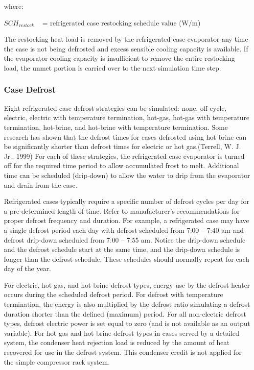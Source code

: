where:

\(SC{H_{restock}}\) ~ = refrigerated case restocking schedule value (W/m)

The restocking heat load is removed by the refrigerated case evaporator any time the case is not being defrosted and excess sensible cooling capacity is available. If the evaporator cooling capacity is insufficient to remove the entire restocking load, the unmet portion is carried over to the next simulation time step.

\subsubsection{Case Defrost}\label{case-defrost}

Eight refrigerated case defrost strategies can be simulated: none, off-cycle, electric, electric with temperature termination, hot-gas, hot-gas with temperature termination, hot-brine, and hot-brine with temperature termination. Some research has shown that the defrost times for cases defrosted using hot brine can be significantly shorter than defrost times for electric or hot gas.(Terrell, W. J. Jr., 1999) For each of these strategies, the refrigerated case evaporator is turned off for the required time period to allow accumulated frost to melt. Additional time can be scheduled (drip-down) to allow the water to drip from the evaporator and drain from the case.

Refrigerated cases typically require a specific number of defrost cycles per day for a pre-determined length of time. Refer to manufacturer's recommendations for proper defrost frequency and duration. For example, a refrigerated case may have a single defrost period each day with defrost scheduled from 7:00 -- 7:40 am and defrost drip-down scheduled from 7:00 -- 7:55 am. Notice the drip-down schedule and the defrost schedule start at the same time, and the drip-down schedule is longer than the defrost schedule. These schedules should normally repeat for each day of the year.

For electric, hot gas, and hot brine defrost types, energy use by the defrost heater occurs during the scheduled defrost period. For defrost with temperature termination, the energy is also multiplied by the defrost ratio simulating a defrost duration shorter than the defined (maximum) period. For all non-electric defrost types, defrost electric power is set equal to zero (and is not available as an output variable). For hot gas and hot brine defrost types in cases served by a detailed system, the condenser heat rejection load is reduced by the amount of heat recovered for use in the defrost system. This condenser credit is not applied for the simple compressor rack system.

